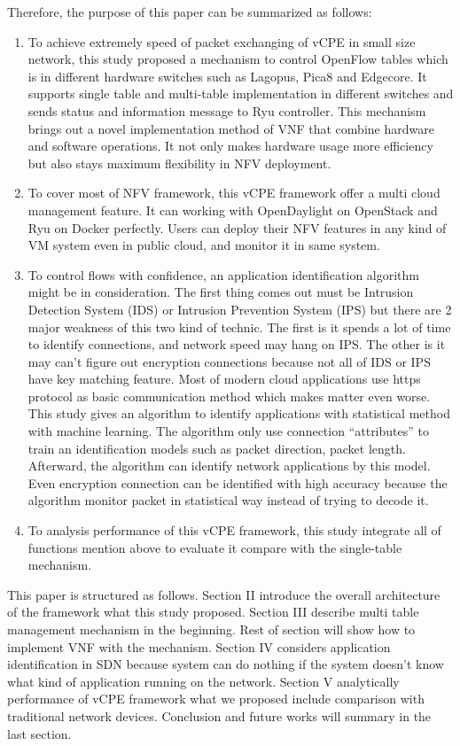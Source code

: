 \documentclass[journal]{IEEEtran}
\begin{document}
Therefore, the purpose of this paper can be summarized as follows:
\begin{enumerate}
\item To achieve extremely speed of packet exchanging of vCPE in small size network, this study proposed a mechanism to control OpenFlow tables which is in different hardware switches such as Lagopus\cite{lagopus-switch}, Pica8\cite{pica8-switch} and Edgecore\cite{edge-core-switch}. It supports single table and multi-table implementation in different switches and sends status and information message to Ryu controller. This mechanism brings out a novel implementation method of VNF that combine hardware and software operations. It not only makes hardware usage more efficiency but also stays maximum flexibility in NFV deployment.
\item To cover most of NFV framework, this vCPE framework offer a multi cloud management feature. It can working with OpenDaylight\cite{opendaylight} on OpenStack\cite{openstack} and Ryu\cite{web:ryu} on Docker\cite{docker} perfectly. Users can deploy their NFV features in any kind of VM system even in public cloud, and monitor it in same system.
\item To control flows with confidence, an application identification algorithm might be in consideration. The first thing comes out must be Intrusion Detection System (IDS) or Intrusion Prevention System (IPS) but there are 2 major weakness of this two kind of technic. The first is it spends a lot of time to identify connections, and network speed may hang on IPS. The other is it may can’t figure out encryption connections because not all of IDS or IPS have key matching feature. Most of modern cloud applications use https protocol as basic communication method which makes matter even worse. This study gives an algorithm to identify applications with statistical method with machine learning. The algorithm only use connection “attributes” to train an identification models such as packet direction, packet length. Afterward, the algorithm can identify network applications by this model. Even encryption connection can be identified with high accuracy because the algorithm monitor packet in statistical way instead of trying to decode it.
\item To analysis performance of this vCPE framework, this study integrate all of functions mention above to evaluate it compare with the single-table mechanism.
\end{enumerate}

This paper is structured as follows. Section II introduce the overall architecture of the framework what this study proposed. Section III describe multi table management mechanism in the beginning. Rest of section will show how to implement VNF with the mechanism. Section IV considers application identification in SDN because system can do nothing if the system doesn’t know what kind of application running on the network. Section V analytically performance of vCPE framework what we proposed include comparison with traditional network devices. Conclusion and future works will summary in the last section.
\end{document}
